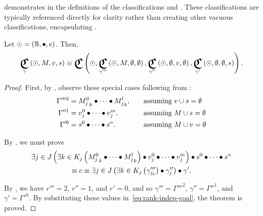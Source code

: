  demonstrates  in the
  definitions of the classifications  and
  .
These classifications are typically referenced directly for clarity rather
  than creating other vacuous classifications,
    encapsulating .


\begin{theorem}
  Let $\odot=\left({\mathbb{B}},{\bullet},{e}\right)$.
  Then,
  \begin{equation}
    \Classify_\gamma\left(\odot,M,v,s\right)
      \equiv \Classify\left(
        \odot,
        \Classify_{\gamma'''}\left(\odot,M,\emptyset,\emptyset\right),
        \Classify_{\gamma''}\left(\odot,\emptyset,v,\emptyset\right),
        \Classify_{\gamma'}\left(\odot,\emptyset,\emptyset,s\right)
      \right).
  \end{equation}
\end{theorem}

\begin{proof}
  First,
    by ,
    observe these special cases following from :
  \begin{equation}
  \begin{alignedat}{3}
    \Gamma'''^2 &= {M^0_j}_k \bullet\cdots\bullet {M^l_j}_k, \qquad&&\text{assuming $v\cup s=\emptyset$} \\
    \Gamma''^1 &= v^0_j\bullet\cdots\bullet v^m_j,        &&\text{assuming $M\cup s=\emptyset$} \\
    \Gamma'^0 &= s^0\bullet\cdots\bullet s^n.      &&\text{assuming $M\cup v=\emptyset$}
  \end{alignedat}
  \end{equation}

  By ,
    we must prove
  \begin{multline}\label{eq:rank-indep-goal}
    \Exists{j\in J}{
        \Exists{k\in K_j}{\cpredmatseq}
        \bullet \cpredvecseq
      }
      \bullet \cpredscalarseq \\
    \equiv c \equiv
    \Exists{j\in J}{
        \Exists{k\in K_j}{\gamma'''_{j_k}}
        \bullet \gamma''_j
      }
      \bullet \gamma'.
  \end{multline}

  By ,
    we have $r'''=2$, $r''=1$, and $r'=0$,
    and so $\gamma'''=\Gamma'''^2$,
      $\gamma''=\Gamma''^1$,
      and $\gamma'=\Gamma'^0$.
  By substituting these values in~\ref{eq:rank-indep-goal},
    the theorem is proved.
\end{proof}

